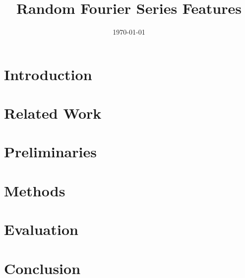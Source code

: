 \documentclass[11pt, a4paper, conference, romanappendices, twocolumn]{IEEEtran}
\begin{document}
    \title{Random Fourier Series Features}
    \author{
        \and
        \and
    }
    \date{\today}

    \maketitle

    \begin{abstract}
        
    \end{abstract}
	\acresetall

    \section{Introduction}
    

    \section{Related Work}  \label{sec:relatedWork}
    

    \section{Preliminaries}  \label{sec:preliminaries}
    

    \section{Methods}  \label{sec:methods}
    

    \section{Evaluation}  \label{sec:eval}
    

    \section{Conclusion}  \label{sec:conclusion}
    

    \FloatBarrier
    
    
    \FloatBarrier
\end{document}
